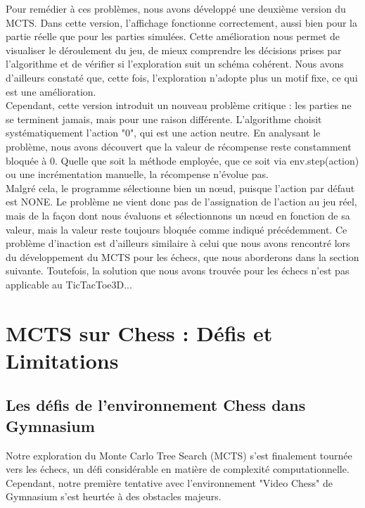 \documentclass{article}
\begin{document}
    \quad Pour remédier à ces problèmes, nous avons développé une deuxième version du MCTS. Dans cette version, l’affichage fonctionne correctement, aussi bien pour la partie réelle que pour les parties simulées. Cette amélioration nous permet de visualiser le déroulement du jeu, de mieux comprendre les décisions prises par l’algorithme et de vérifier si l’exploration suit un schéma cohérent. Nous avons d’ailleurs constaté que, cette fois, l’exploration n’adopte plus un motif fixe, ce qui est une amélioration.\\
    
    Cependant, cette version introduit un nouveau problème critique : les parties ne se terminent jamais, mais pour une raison différente. L’algorithme choisit systématiquement l’action "0", qui est une action neutre. En analysant le problème, nous avons découvert que la valeur de récompense reste constamment bloquée à 0. Quelle que soit la méthode employée, que ce soit via env.step(action) ou une incrémentation manuelle, la récompense n’évolue pas.\\

    Malgré cela, le programme sélectionne bien un nœud, puisque l’action par défaut est NONE. Le problème ne vient donc pas de l’assignation de l’action au jeu réel, mais de la façon dont nous évaluons et sélectionnons un nœud en fonction de sa valeur, mais la valeur reste toujours bloquée comme indiqué précédemment. Ce problème d'inaction est d’ailleurs similaire à celui que nous avons rencontré lors du développement du MCTS pour les échecs, que nous aborderons dans la section suivante. Toutefois, la solution que nous avons trouvée pour les échecs n’est pas applicable au TicTacToe3D...

\clearpage

\section{MCTS sur Chess : Défis et Limitations}

\subsection{Les défis de l'environnement Chess dans Gymnasium}

\quad Notre exploration du Monte Carlo Tree Search (MCTS) s'est finalement tournée vers les échecs, un défi considérable en matière de complexité computationnelle. Cependant, notre première tentative avec l'environnement "Video Chess" de Gymnasium s'est heurtée à des obstacles majeurs.\\
\end{document}
